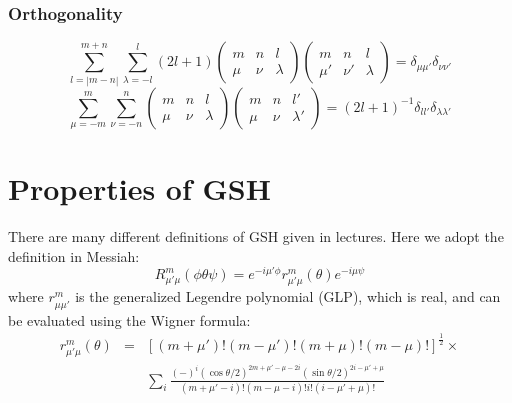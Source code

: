 \subsubsection*{Orthogonality}

\begin{equation}
\sum_{l=\left|m-n\right|}^{m+n}\sum_{\lambda=-l}^{l}\left(2l+1\right)\left(\begin{array}{ccc}
m & n & l\\
\mu & \nu & \lambda
\end{array}\right)\left(\begin{array}{ccc}
m & n & l\\
\mu' & \nu' & \lambda
\end{array}\right)=\delta_{\mu\mu'}\delta_{\nu\nu'}\label{eq:3j-orthogonality}
\end{equation}
\begin{equation}
\sum_{\mu=-m}^{m}\sum_{\nu=-n}^{n}\left(\begin{array}{ccc}
m & n & l\\
\mu & \nu & \lambda
\end{array}\right)\left(\begin{array}{ccc}
m & n & l'\\
\mu & \nu & \lambda'
\end{array}\right)=\left(2l+1\right)^{-1}\delta_{ll'}\delta_{\lambda\lambda'}
\end{equation}



\section{Properties of GSH}

There are many different definitions of GSH given in lectures. Here
we adopt the definition in Messiah:
\begin{equation}
R_{\mu'\mu}^{m}(\phi\theta\psi)=e^{-i\mu'\phi}r_{\mu'\mu}^{m}(\theta)e^{-i\mu\psi}
\end{equation}
where $r_{\mu\mu'}^{m}$ is the generalized Legendre polynomial (GLP),
which is real, and can be evaluated using the Wigner formula:
\begin{eqnarray}
r_{\mu'\mu}^{m}(\theta) & = & \left[\left(m+\mu'\right)!\left(m-\mu'\right)!\left(m+\mu\right)!\left(m-\mu\right)!\right]^{\frac{1}{2}}\times\nonumber \\
 &  & \sum_{i}\frac{\left(-\right)^{i}\left(\cos\theta/2\right)^{2m+\mu'-\mu-2i}\left(\sin\theta/2\right)^{2i-\mu'+\mu}}{\left(m+\mu'-i\right)!\left(m-\mu-i\right)!i!\left(i-\mu'+\mu\right)!}
\end{eqnarray}



